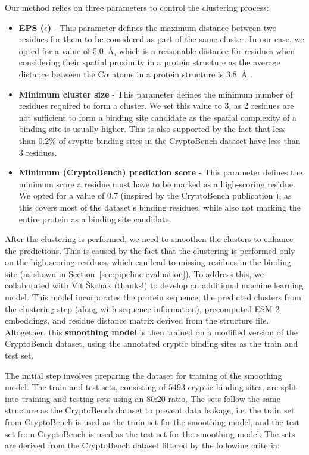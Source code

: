 Our method relies on three parameters to control the clustering process:
\begin{itemize}
    \item \textbf{EPS ($\epsilon$)} - This parameter defines the maximum distance between two residues for them to be considered as part of the same cluster. In our case, we opted for a value of 5.0~\AA, which is a reasonable distance for residues when considering their spatial proximity in a protein structure as the average distance between the C$\alpha$ atoms in a protein structure is 3.8~\AA{} \cite{creighton1993proteins}.
    \item \textbf{Minimum cluster size} - This parameter defines the minimum number of residues required to form a cluster. We set this value to 3, as 2 residues are not sufficient to form a binding site candidate as the spatial complexity of a binding site is usually higher. This is also supported by the fact that less than 0.2\% of cryptic binding sites in the CryptoBench dataset have less than 3 residues.
    \item \textbf{Minimum (CryptoBench) prediction score} - This parameter defines the minimum score a residue must have to be marked as a high-scoring residue. We opted for a value of 0.7 (inspired by the CryptoBench publication \cite{vskrhak2025cryptobench}), as this covers most of the dataset's binding residues, while also not marking the entire protein as a binding site candidate.
\end{itemize}

After the clustering is performed, we need to smoothen the clusters to enhance the predictions. This is caused by the fact that the clustering is performed only on the high-scoring residues, which can lead to missing residues in the binding site (as shown in Section~\ref{sec:pipeline-evaluation}). To address this, we collaborated with Vít Škrhák (thanks!) to develop an additional machine learning model. This model incorporates the protein sequence, the predicted clusters from the clustering step (along with sequence information), precomputed ESM-2 embeddings, and residue distance matrix derived from the structure file. Altogether, this \textbf{smoothing model} is then trained on a modified version of the CryptoBench dataset, using the annotated cryptic binding sites as the train and test set.

The initial step involves preparing the dataset for training of the smoothing model. The train and test sets, consisting of 5493 cryptic binding sites, are split into training and testing sets using an 80:20 ratio. The sets follow the same structure as the CryptoBench dataset to prevent data leakage, i.e. the train set from CryptoBench is used as the train set for the smoothing model, and the test set from CryptoBench is used as the test set for the smoothing model. The sets are derived from the CryptoBench dataset filtered by the following criteria:

